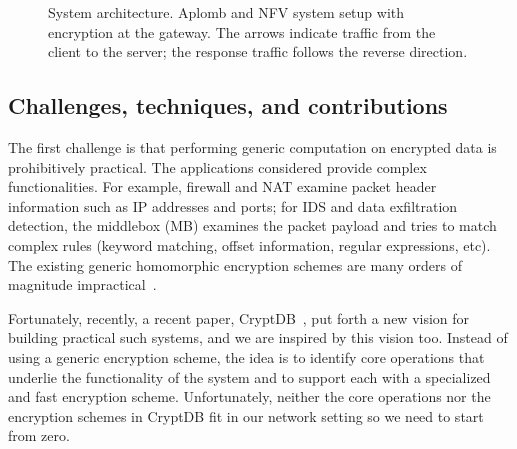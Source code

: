 \begin{figure}[t!]
\centering
{}
%
\hfill  
{}
     
\caption{System architecture. Aplomb and NFV system setup with \sys encryption  at the gateway. The arrows indicate traffic from the client to the server; the response traffic follows the reverse direction. \label{fig:sys-overview}}
\end{figure}

    \subsection{Challenges, techniques, and contributions}
    
The first challenge is that performing generic computation on encrypted data is prohibitively practical. The applications considered provide complex functionalities. For example, firewall and NAT examine packet header information such as IP addresses and ports; for IDS and data exfiltration detection, the middlebox (MB) examines the packet payload and tries to match complex rules (keyword matching, offset information,  regular expressions, etc). The existing generic homomorphic encryption schemes are many orders of magnitude impractical~\cite{aesFHE}.

Fortunately, recently, a recent paper, CryptDB~\cite{popa:cryptdb}, put forth a new vision for building practical such systems, and we are inspired by this vision too. Instead of using a generic encryption scheme, the idea is to identify core operations that underlie the functionality of the system and to support each with a specialized and fast encryption scheme. Unfortunately, neither the core operations nor the encryption schemes in CryptDB fit in our network setting so we need to start from zero.


